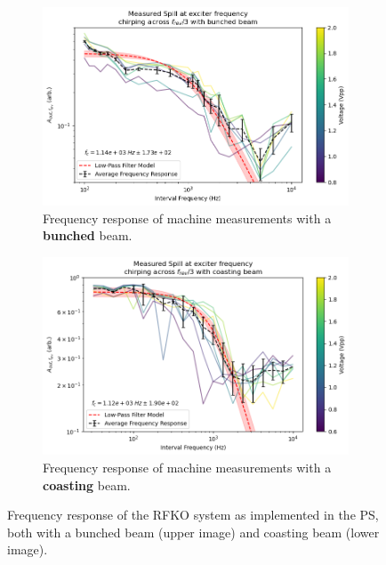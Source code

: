 \documentclass[a4paper,twoside,11pt]{report}
\begin{document}
\begin{figure}[h]
  \centering
  \begin{subfigure}[b]{0.9\linewidth}
    \includegraphics*[width=\linewidth]{machine_rf_on.png}
    \caption{Frequency response of machine measurements with a \textbf{bunched} beam.}\label{machine_rf_on}
  \end{subfigure}
  \begin{subfigure}[b]{0.9\linewidth}
    \includegraphics*[width=\linewidth]{machine_rf_off.png}
    \caption{Frequency response of machine measurements with a \textbf{coasting} beam.}\label{machine_rf_off}
  \end{subfigure}
  \caption[Measured RFKO frequency response]{Frequency response of the RFKO system as implemented in the PS, both with a bunched beam (upper image) and coasting beam (lower image).}\label{fig:freq_response_machine}
\end{figure}
\end{document}
